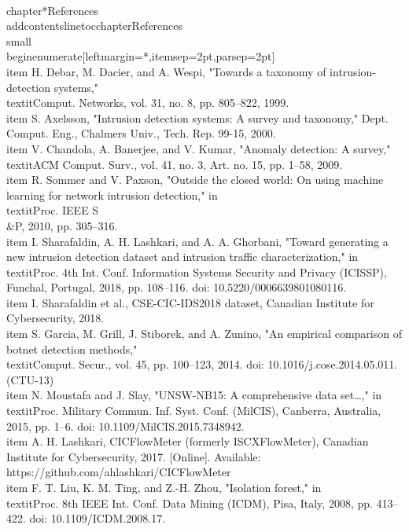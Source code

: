 \documentclass[12pt,a4paper,oneside]{report}
\begin{document}
\\chapter*{References}
\\addcontentsline{toc}{chapter}{References}
\\small
\\begin{enumerate}[leftmargin=*,itemsep=2pt,parsep=2pt]
\\item H. Debar, M. Dacier, and A. Wespi, "Towards a taxonomy of intrusion-detection systems," \\textit{Comput. Networks}, vol. 31, no. 8, pp. 805–822, 1999.
\\item S. Axelsson, "Intrusion detection systems: A survey and taxonomy," Dept. Comput. Eng., Chalmers Univ., Tech. Rep. 99-15, 2000.
\\item V. Chandola, A. Banerjee, and V. Kumar, "Anomaly detection: A survey," \\textit{ACM Comput. Surv.}, vol. 41, no. 3, Art. no. 15, pp. 1–58, 2009.
\\item R. Sommer and V. Paxson, "Outside the closed world: On using machine learning for network intrusion detection," in \\textit{Proc. IEEE S\\&P}, 2010, pp. 305–316.
\\item I. Sharafaldin, A. H. Lashkari, and A. A. Ghorbani, "Toward generating a new intrusion detection dataset and intrusion traffic characterization," in \\textit{Proc. 4th Int. Conf. Information Systems Security and Privacy (ICISSP)}, Funchal, Portugal, 2018, pp. 108–116. doi: 10.5220/0006639801080116.
\\item I. Sharafaldin et al., CSE-CIC-IDS2018 dataset, Canadian Institute for Cybersecurity, 2018.
\\item S. Garcia, M. Grill, J. Stiborek, and A. Zunino, "An empirical comparison of botnet detection methods," \\textit{Comput. Secur.}, vol. 45, pp. 100–123, 2014. doi: 10.1016/j.cose.2014.05.011. (CTU-13)
\\item N. Moustafa and J. Slay, "UNSW-NB15: A comprehensive data set…," in \\textit{Proc. Military Commun. Inf. Syst. Conf. (MilCIS)}, Canberra, Australia, 2015, pp. 1–6. doi: 10.1109/MilCIS.2015.7348942.
\\item A. H. Lashkari, CICFlowMeter (formerly ISCXFlowMeter), Canadian Institute for Cybersecurity, 2017. [Online]. Available: https://github.com/ahlashkari/CICFlowMeter
\\item F. T. Liu, K. M. Ting, and Z.-H. Zhou, "Isolation forest," in \\textit{Proc. 8th IEEE Int. Conf. Data Mining (ICDM)}, Pisa, Italy, 2008, pp. 413–422. doi: 10.1109/ICDM.2008.17.
\end{document}
